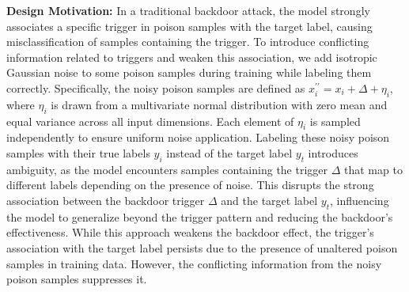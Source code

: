 \noindent \textbf{Design Motivation:} In a traditional backdoor attack, the model strongly associates a specific trigger in poison samples with the target label, causing misclassification of samples containing the trigger. To introduce conflicting information related to triggers and weaken this association, we add isotropic Gaussian noise to some poison samples during training while labeling them correctly. Specifically, the noisy poison samples are defined as $x_i^{\prime\prime} = x_i + \Delta + \eta_i$, where $\eta_i$ is drawn from a multivariate normal distribution with zero mean and equal variance across all input dimensions. Each element of $\eta_i$ is sampled independently to ensure uniform noise application. Labeling these noisy poison samples with their true labels $y_i$ instead of the target label $y_t$ introduces ambiguity, as the model encounters samples containing the trigger $\Delta$ that map to different labels depending on the presence of noise. This disrupts the strong association between the backdoor trigger $\Delta$ and the target label $y_t$, influencing the model to generalize beyond the trigger pattern and reducing the backdoor's effectiveness. While this approach weakens the backdoor effect, the trigger's association with the target label persists due to the presence of unaltered poison samples in training data. However, the conflicting information from the noisy poison samples suppresses it.

